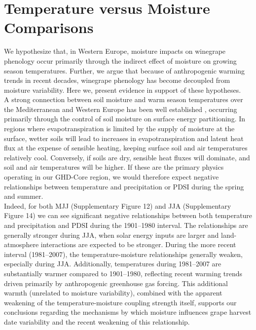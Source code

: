 \documentclass[12pt]{article}
\begin{document}
\section*{Temperature versus Moisture Comparisons}
\noindent We hypothesize that, in Western Europe, moisture impacts on winegrape phenology occur primarily through the indirect effect of moisture on growing season temperatures. Further, we argue that because of anthropogenic warming trends in recent decades, winegrape phenology has become decoupled from moisture variability. Here we, present evidence in support of these hypotheses.\\ %
\indent A strong connection between soil moisture and warm season temperatures over the Mediterranean and Western Europe has been well established \cite{Fischer2007,Miralles2014}, occurring primarily through the control of soil moisture on surface energy partitioning. In regions where evapotranspiration is limited by the supply of moisture at the surface, wetter soils will lead to increases in evapotranspiration and latent heat flux at the expense of sensible heating, keeping surface soil and air temperatures relatively cool. Conversely, if soils are dry, sensible heat fluxes will dominate, and soil and air temperatures will be higher. If these are the primary physics operating in our GHD-Core region, we would therefore expect negative relationships between temperature and precipitation or PDSI during the spring and summer.\\
\indent Indeed, for both MJJ (Supplementary Figure 12) and JJA (Supplementary Figure 14) we can see significant negative relationships between both temperature and precipitation and PDSI during the 1901--1980 interval. The relationships are generally stronger during JJA, when solar energy inputs are larger and land-atmosphere interactions are expected to be stronger. During the more recent interval (1981--2007), the temperature-moisture relationships generally weaken, especially during JJA. Additionally, temperatures during 1981--2007 are substantially warmer compared to 1901--1980, reflecting recent warming trends driven primarily by anthropogenic greenhouse gas forcing. This additional warmth (unrelated to moisture variability), combined with the apparent weakening of the temperature-moisture coupling strength itself, supports our conclusions regarding the mechanisms by which moisture influences grape harvest date variability and the recent weakening of this relationship.
\end{document}
